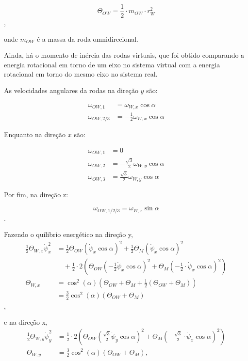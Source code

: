 \begin{equation}
    \Theta_{OW} = \frac{1}{2} \cdot m_{OW} \cdot r_W^2
\end{equation},

onde $m_{OW}$ é a massa da roda omnidirecional.

Ainda, há o momento de inércia das rodas virtuais, que foi obtido comparando a energia rotacional em torno de um eixo no sistema virtual com a energia rotacional em torno do mesmo eixo no sistema real.

As velocidades angulares da rodas na direção $y$ são:

\begin{align*}
\omega_{OW,1} &= \omega_{W,x} \cos \alpha \\
\omega_{OW,2/3} &= -\frac{1}{2} \omega_{W,x} \cos \alpha
\end{align*}

Enquanto na direção $x$ são:

\begin{align*}
\omega_{OW,1} &= 0 \\
\omega_{OW,2} &= -\frac{\sqrt{3}}{2} \omega_{W,y} \cos \alpha \\
\omega_{OW,3} &= \frac{\sqrt{3}}{2} \omega_{W,y} \cos \alpha
\end{align*}

Por fim, na direção z:

\begin{equation*}
    \omega_{OW,1/2/3} = \omega_{W,z} \sin \alpha
\end{equation*}.

Fazendo o quilibrio energético na direção y,
\begin{align*}
\frac{1}{2} \Theta_{W,x} \dot{\psi}_x^2 &= \frac{1}{2} \Theta_{OW} (\dot{\psi}_x \cos \alpha)^2 + \frac{1}{2} \Theta_M (\dot{\psi}_x \cos \alpha)^2 \\
&\quad + \frac{1}{2} \cdot 2 \left( \Theta_{OW} \left(-\frac{1}{2} \dot{\psi}_x \cos \alpha \right)^2 + \Theta_M \left(-\frac{1}{2} \cdot \dot{\psi}_x \cos \alpha \right)^2 \right) \\
\Theta_{W,x} &= \cos^2(\alpha) \left( \Theta_{OW} + \Theta_M + \frac{1}{2} \left( \Theta_{OW} + \Theta_M \right) \right) \\
&= \frac{3}{2} \cos^2(\alpha) \left( \Theta_{OW} + \Theta_M \right)
\end{align*},

e na direção x,
\begin{align*}
\frac{1}{2} \Theta_{W,y} \dot{\psi}_y^2 &= \frac{1}{2} \cdot 2 \left( \Theta_{OW} \left(\frac{\sqrt{3}}{2} \dot{\psi}_y \cos \alpha \right)^2 + \Theta_M \left(-\frac{\sqrt{3}}{2} \cdot \dot{\psi}_x \cos \alpha \right)^2 \right) \\
\Theta_{W,y} &= \frac{3}{2} \cos^2(\alpha) (\Theta_{OW} + \Theta_M),
\end{align*}

